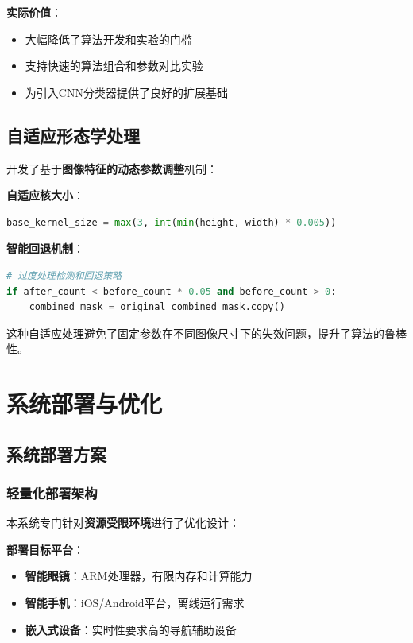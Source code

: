 \documentclass[12pt,a4paper]{article}
\begin{document}
\textbf{实际价值}：
\begin{itemize}
    \item 大幅降低了算法开发和实验的门槛
    \item 支持快速的算法组合和参数对比实验
    \item 为引入CNN分类器提供了良好的扩展基础
\end{itemize}

\subsection{自适应形态学处理}

开发了基于\textbf{图像特征的动态参数调整}机制：

\textbf{自适应核大小}：
\begin{lstlisting}[language=Python]
base_kernel_size = max(3, int(min(height, width) * 0.005))
\end{lstlisting}

\textbf{智能回退机制}：
\begin{lstlisting}[language=Python]
# 过度处理检测和回退策略
if after_count < before_count * 0.05 and before_count > 0:
    combined_mask = original_combined_mask.copy()
\end{lstlisting}

这种自适应处理避免了固定参数在不同图像尺寸下的失效问题，提升了算法的鲁棒性。

\section{系统部署与优化}

\subsection{系统部署方案}

\subsubsection{轻量化部署架构}

本系统专门针对\textbf{资源受限环境}进行了优化设计：

\textbf{部署目标平台}：
\begin{itemize}
    \item \textbf{智能眼镜}：ARM处理器，有限内存和计算能力
    \item \textbf{智能手机}：iOS/Android平台，离线运行需求
    \item \textbf{嵌入式设备}：实时性要求高的导航辅助设备
\end{itemize}
\end{document}
